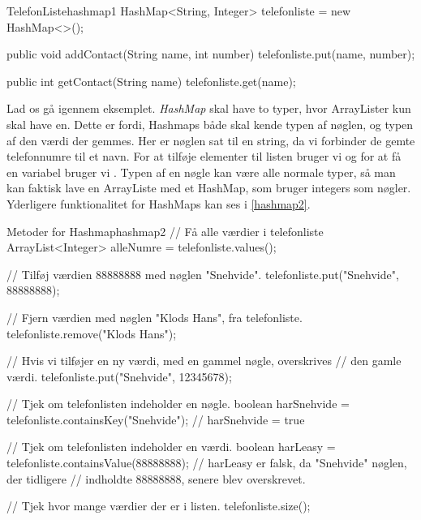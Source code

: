 \begin{JavaCode}{TelefonListe}{hashmap1}
	HashMap<String, Integer> telefonliste = new HashMap<>();

	public void addContact(String name, int number){
		telefonliste.put(name, number);
	}

	public int getContact(String name){
		telefonliste.get(name);
	}
\end{JavaCode}

Lad os gå igennem eksemplet. \emph{HashMap} skal have to typer, hvor
ArrayLister kun skal have en.  Dette er fordi, Hashmaps både skal
kende typen af nøglen, og typen af den værdi der gemmes. Her er
nøglen sat til en string, da vi forbinder de gemte telefonnumre til et
navn.
For at tilføje elementer til listen bruger vi  og for at få en variabel bruger vi .
Typen af en nøgle kan være alle normale typer, så man kan faktisk lave en
ArrayListe med et HashMap, som bruger integers som nøgler. Yderligere
funktionalitet for HashMaps kan ses i \autoref{hashmap2}.

\begin{JavaCode}{Metoder for Hashmap}{hashmap2}
    // Få alle værdier i telefonliste
	ArrayList<Integer> alleNumre = telefonliste.values();

    // Tilføj værdien 88888888 med nøglen "Snehvide".
    telefonliste.put("Snehvide", 88888888);

    // Fjern værdien med nøglen "Klods Hans", fra telefonliste.
	telefonliste.remove("Klods Hans");

    // Hvis vi tilføjer en ny værdi, med en gammel nøgle, overskrives
    // den gamle værdi.
    telefonliste.put("Snehvide", 12345678);

    // Tjek om telefonlisten indeholder en nøgle.
	boolean harSnehvide = telefonliste.containsKey("Snehvide");
    // harSnehvide = true

    // Tjek om telefonlisten indeholder en værdi.
	boolean harLeasy = telefonliste.containsValue(88888888);
    // harLeasy er falsk, da "Snehvide" nøglen, der tidligere
    // indholdte 88888888, senere blev overskrevet.

    // Tjek hvor mange værdier der er i listen.
	telefonliste.size();
\end{JavaCode}


